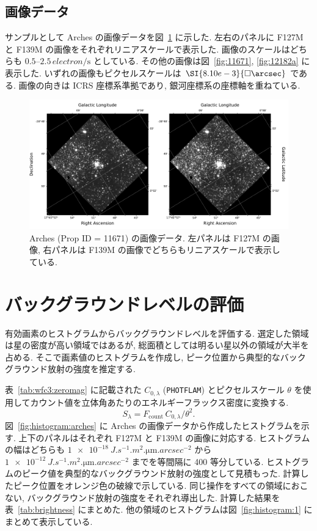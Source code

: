 \documentclass[10pt,a4paper,dvipdfmx,uplatex]{jsarticle}
\begin{document}
\subsection{画像データ}
サンプルとして Arches の画像データを図~\ref{fig:11671:arches} に示した. 左右のパネルに F127M と F139M の画像をそれぞれリニアスケールで表示した. 画像のスケールはどちらも $\numrange{0.5}{2.5}\,\unit{electron\per\second}$ としている. その他の画像は図~\ref{fig:11671}, \ref{fig:12182a} に表示した. いずれの画像もピクセルスケールは $\SI{8.10e-3}{\square\arcsec}$ である. 画像の向きは ICRS 座標系準拠であり, 銀河座標系の座標軸を重ねている.

\begin{figure}
  \centering
  \includegraphics[width=\linewidth]{img/hst_11671_04_wfc3_ir_f127m_drz.pdf}
  \caption{Arches (Prop ID = 11671) の画像データ. 左パネルは F127M の画像, 右パネルは F139M の画像でどちらもリニアスケールで表示している.}
  \label{fig:11671:arches}
\end{figure}

\section{バックグラウンドレベルの評価}
有効画素のヒストグラムからバックグラウンドレベルを評価する. 選定した領域は星の密度が高い領域ではあるが, 総面積としては明るい星以外の領域が大半を占める. そこで画素値のヒストグラムを作成し, ピーク位置から典型的なバックグラウンド放射の強度を推定する.

表~\ref{tab:wfc3:zeromag} に記載された $C_{0,\lambda}$ (\texttt{PHOTFLAM}) とピクセルスケール $\theta$ を使用してカウント値を立体角あたりのエネルギーフラックス密度に変換する.
\begin{equation}
  S_{\lambda} = F_\text{count}\,C_{0,\lambda}/\theta^2.
  \label{eq:conversion}
\end{equation}
図~\ref{fig:histogram:arches} に Arches の画像データから作成したヒストグラムを示す. 上下のパネルはそれぞれ F127M と F139M の画像に対応する. ヒストグラムの幅はどちらも $\SI{1e-18}{J.s^{-1}.m^2.\micro\meter.arcsec^{-2}}$ から $\SI{1e-12}{J.s^{-1}.m^2.\micro\meter.arcsec^{-2}}$ までを等間隔に 400 等分している. ヒストグラムのピーク値を典型的なバックグラウンド放射の強度として見積もった. 計算したピーク位置をオレンジ色の破線で示している. 同じ操作をすべての領域におこない, バックグラウンド放射の強度をそれぞれ導出した. 計算した結果を表~\ref{tab:brightness} にまとめた. 他の領域のヒストグラムは図~\ref{fig:histogram:1} にまとめて表示している.
\end{document}
